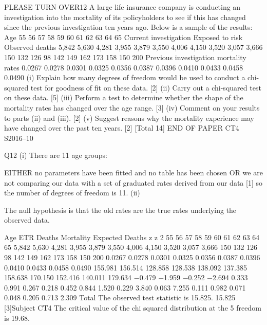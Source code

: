 PLEASE TURN OVER12
A large life insurance company is conducting an investigation into the mortality of its
policyholders to see if this has changed since the previous investigation ten years ago.
Below is a sample of the results:
Age
55
56
57
58
59
60
61
62
63
64
65
Current investigation
Exposed to risk Observed deaths
5,842
5,630
4,281
3,955
3,879
3,550
4,006
4,150
3,520
3,057
3,666
150
132
126
98
142
149
162
173
158
150
200
Previous investigation
mortality rates
0.0267
0.0278
0.0301
0.0325
0.0356
0.0387
0.0396
0.0410
0.0433
0.0458
0.0490
(i) Explain how many degrees of freedom would be used to conduct a chi-squared
test for goodness of fit on these data.
[2]
(ii) Carry out a chi-squared test on these data.
[5]
(iii) Perform a test to determine whether the shape of the mortality rates has
changed over the age range.
[3]
(iv) Comment on your results to parts (ii) and (iii).
[2]
(v) Suggest reasons why the mortality experience may have changed over the past
ten years.
[2]
[Total 14]
END OF PAPER
CT4 S2016–10

Q12
(i)
There are 11 age groups:

EITHER
no parameters have been fitted and no table has been chosen
OR
we are not comparing our data with a set of graduated rates derived from our data [1]
so the number of degrees of freedom is 11.
(ii)

The null hypothesis is that the old rates are the true rates underlying the observed data.

Age ETR Deaths Mortality Expected
Deaths z z 2
55
56
57
58
59
60
61
62
63
64
65 5,842
5,630
4,281
3,955
3,879
3,550
4,006
4,150
3,520
3,057
3,666 150
132
126
98
142
149
162
173
158
150
200 0.0267
0.0278
0.0301
0.0325
0.0356
0.0387
0.0396
0.0410
0.0433
0.0458
0.0490 155.981
156.514
128.858
128.538
138.092
137.385
158.638
170.150
152.416
140.011
179.634 −0.479
−1.959
−0.252
−2.694
0.333
0.991
0.267
0.218
0.452
0.844
1.520 0.229
3.840
0.063
7.255
0.111
0.982
0.071
0.048
0.205
0.713
2.309
Total
The observed test statistic is 15.825.
15.825
[3]Subject CT4 %
The critical value of the chi squared distribution at the 5%
freedom is 19.68.

